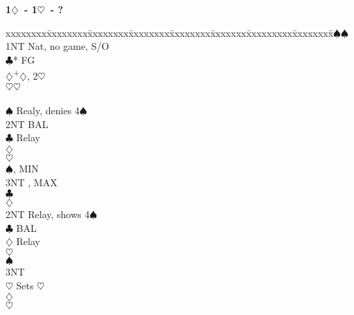 \documentclass[10pt]{article}
\renewcommand{\c}{$\clubsuit$}
\renewcommand{\d}{$\diamondsuit$}
\newcommand{\h}{$\heartsuit$}
\newcommand{\s}{$\spadesuit$}
\newcommand{\p}{\textsuperscript{+}}
\newcommand{\m}{\textsuperscript{\textminus}}
\newenvironment{bidtable}[1][]
{\textbf{#1}
  \begin{adjustwidth}{1em}{}
    \addvspace{2pt}
    \begin{tabbing}
      xxxxxxxx\=xxxxxxxx\=xxxxxxxx\=xxxxxxxx\=xxxxxxxx\=xxxxxxx\=xxxxxxxxx\=xxxxxxxx\=\kill}
{\end{tabbing}\end{adjustwidth}\bigskip}%
\begin{document}
\begin{bidtable}[1\d\ - 1\h\ - ?]
1\s  {}\s                                                     \\
     \> 1NT  \> Nat, no game, S/O                               \\
     \c* \> FG                                              \\
     \>      \d {}\p\d, 2\m\h                             \\
     \>      \h {}\h                                      \\
     \>      \>     \>      \>       \>                         \\
     \>      \>     \s  \> Realy, denies 4\s                \\
     \>      \>     \>      \> 2NT   \> BAL                     \\
     \>      \>     \>      \>       \c \> Relay            \\
     \>      \>     \>      \>       \>     \d {}      \\
     \>      \>     \>      \>       \>     \h {}      \\
     \>      \>     \>      \>       \>     \s {}, MIN \\
     \>      \>     \>      \>       \>     \> 3NT , MAX \\
     \>      \>     \>      \c   {}                    \\
     \>      \>     \>      \d   {}                    \\
     \>      \>     \> 2NT  \> Relay, shows 4\s                 \\
     \>      \>     \>      \c   \> BAL                     \\
     \>      \>     \>      \>       \d \> Relay            \\
     \>      \>     \>      \>       \>     \h {}      \\
     \>      \>     \>      \>       \>     \s {}      \\
     \>      \>     \>      \>       \>     \> 3NT       \\
     \>      \>     \>      \>       \h \> Sets \h          \\
     \>      \>     \>      \d   {}                    \\
     \>      \>     \>      \h   {}                    \\

\end{bidtable}
\end{document}
